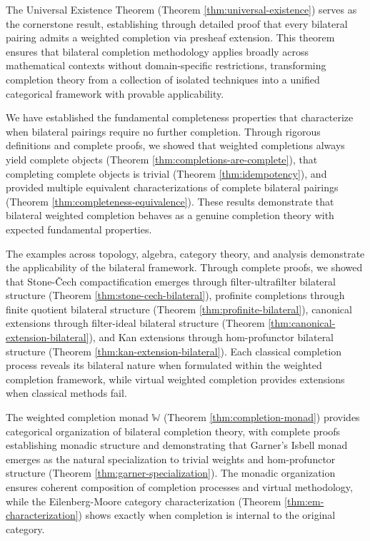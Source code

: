 \documentclass[11pt]{article}
\theoremstyle{plain}
\theoremstyle{definition}
\theoremstyle{remark}
\begin{document}
The Universal Existence Theorem (Theorem \ref{thm:universal-existence}) serves as the cornerstone result, establishing through detailed proof that every bilateral pairing admits a weighted completion via presheaf extension. This theorem ensures that bilateral completion methodology applies broadly across mathematical contexts without domain-specific restrictions, transforming completion theory from a collection of isolated techniques into a unified categorical framework with provable applicability.

We have established the fundamental completeness properties that characterize when bilateral pairings require no further completion. Through rigorous definitions and complete proofs, we showed that weighted completions always yield complete objects (Theorem \ref{thm:completions-are-complete}), that completing complete objects is trivial (Theorem \ref{thm:idempotency}), and provided multiple equivalent characterizations of complete bilateral pairings (Theorem \ref{thm:completeness-equivalence}). These results demonstrate that bilateral weighted completion behaves as a genuine completion theory with expected fundamental properties.

The examples across topology, algebra, category theory, and analysis demonstrate the applicability of the bilateral framework. Through complete proofs, we showed that Stone-\v{C}ech compactification emerges through filter-ultrafilter bilateral structure (Theorem \ref{thm:stone-cech-bilateral}), profinite completions through finite quotient bilateral structure (Theorem \ref{thm:profinite-bilateral}), canonical extensions through filter-ideal bilateral structure (Theorem \ref{thm:canonical-extension-bilateral}), and Kan extensions through hom-profunctor bilateral structure (Theorem \ref{thm:kan-extension-bilateral}). Each classical completion process reveals its bilateral nature when formulated within the weighted completion framework, while virtual weighted completion provides extensions when classical methods fail.

The weighted completion monad $\mathbb{W}$ (Theorem \ref{thm:completion-monad}) provides categorical organization of bilateral completion theory, with complete proofs establishing monadic structure and demonstrating that Garner's Isbell monad emerges as the natural specialization to trivial weights and hom-profunctor structure (Theorem \ref{thm:garner-specialization}). The monadic organization ensures coherent composition of completion processes and virtual methodology, while the Eilenberg-Moore category characterization (Theorem \ref{thm:em-characterization}) shows exactly when completion is internal to the original category.
\end{document}

